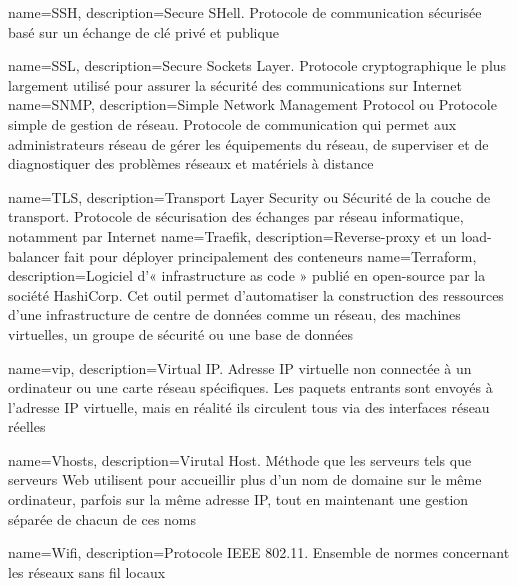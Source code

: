 {
    name=SSH,
    description={Secure SHell. Protocole de communication sécurisée basé sur un échange de clé privé et publique}
}

{
    name=SSL,
    description={Secure Sockets Layer. Protocole cryptographique le plus largement utilisé pour assurer la sécurité des communications sur Internet}
}
{
    name=SNMP,
    description={Simple Network Management Protocol ou Protocole simple de gestion de réseau. Protocole de communication qui permet aux administrateurs réseau de gérer les équipements du réseau, de superviser et de diagnostiquer des problèmes réseaux et matériels à distance}
}

{
    name=TLS,
    description={Transport Layer Security ou Sécurité de la couche de transport. Protocole de sécurisation des échanges par réseau informatique, notamment par Internet}
}
{
    name=Traefik,
    description={Reverse-proxy et un load-balancer fait pour déployer principalement des conteneurs}
}
{
    name=Terraform,
    description={Logiciel d'« infrastructure as code » publié en open-source par la société HashiCorp. Cet outil permet d'automatiser la construction des ressources d'une infrastructure de centre de données comme un réseau, des machines virtuelles, un groupe de sécurité ou une base de données}
}


{
    name=vip,
    description={Virtual IP. Adresse IP virtuelle non connectée à un ordinateur ou une carte réseau spécifiques. Les paquets entrants sont envoyés à l'adresse IP virtuelle, mais en réalité ils circulent tous via des interfaces réseau réelles}
}

{
    name=Vhosts,
    description={Virutal Host. Méthode que les serveurs tels que serveurs Web utilisent pour accueillir plus d'un nom de domaine sur le même ordinateur, parfois sur la même adresse IP, tout en maintenant une gestion séparée de chacun de ces noms}
}

{
    name=Wifi,
    description={Protocole IEEE 802.11. Ensemble de normes concernant les réseaux sans fil locaux}
}

